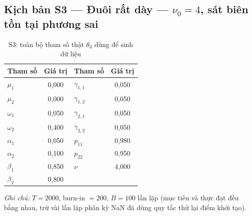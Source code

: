 \documentclass[11pt,a4paper]{article}
\begin{document}
\subsection*{Kịch bản S3 --- Đuôi rất dày --- $\nu_0=4$, sát biên tồn tại phương sai}
\begin{table}[H]\centering\small
\caption{S3: toàn bộ tham số thật $\theta_0$ dùng để sinh dữ liệu}
\begin{tabularx}{\textwidth}{l C  l C}
\toprule
\textbf{Tham số} & \textbf{Giá trị} & \textbf{Tham số} & \textbf{Giá trị} \\
\midrule
$\mu_1$ & 0,000 & $\gamma_{1,1}$ & 0,050 \\
$\mu_2$ & 0,000 & $\gamma_{1,2}$ & 0,050 \\
$\omega_1$ & 0,050 & $\gamma_{2,1}$ & 0,050 \\
$\omega_2$ & 0,400 & $\gamma_{2,2}$ & 0,050 \\
$\alpha_1$ & 0,050 & $p_{11}$ & 0,980 \\
$\alpha_2$ & 0,100 & $p_{22}$ & 0,950 \\
$\beta_1$ & 0,850 & $\nu$ & 4,000 \\
$\beta_2$ & 0,800 &  &  \\
\bottomrule
\end{tabularx}
\vspace{0.2em}\raggedright\scriptsize \emph{Ghi chú:} $T=2000$, burn-in $=200$, $B=100$ lần lặp (mục tiêu và thực đạt đều bằng nhau, trừ vài lần lặp phân kỳ NaN đã dùng quy tắc thử lại điểm khởi tạo).
\end{table}
\end{document}
